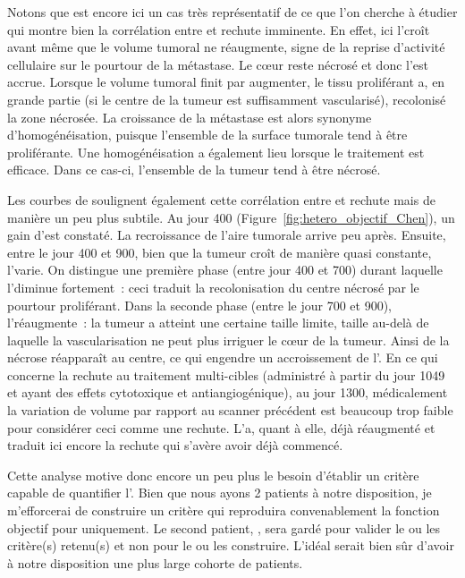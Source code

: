 \documentclass[main.tex]{subfiles}
\begin{document}
 
Notons que \Nber est encore ici un cas très représentatif de ce que l'on cherche à étudier \ie qui montre bien la corrélation entre \hetero et rechute imminente. En effet, ici l'\hetero croît avant même que le volume tumoral ne réaugmente, signe de la reprise d'activité cellulaire sur le pourtour de la métastase. Le c\oe{}ur reste nécrosé et donc l'\hetero est accrue. Lorsque le volume tumoral  finit par augmenter, le tissu proliférant a, en grande partie (si le centre de la tumeur est suffisamment vascularisé), recolonisé la zone nécrosée. La croissance de la métastase est alors synonyme d'homogénéisation, puisque l'ensemble de la surface tumorale tend à être proliférante. Une homogénéisation a également lieu lorsque le traitement est efficace. Dans ce cas-ci, l'ensemble de la tumeur tend à être nécrosé. 


Les courbes de \Chen soulignent également cette corrélation entre \hetero et rechute mais de manière un peu plus subtile. Au jour 400 (\cf Figure~\ref{fig:hetero_objectif_Chen}), un gain d'\hetero est constaté. La recroissance de l'aire tumorale arrive peu après. Ensuite, entre le jour 400 et 900, bien que la tumeur croît de manière quasi constante, l'\hetero varie. On distingue une première phase (entre jour 400 et 700) durant laquelle l'\hetero diminue fortement~: ceci traduit la recolonisation du centre nécrosé par le pourtour proliférant. Dans la seconde phase (entre le jour 700 et 900), l'\hetero réaugmente~: la tumeur a atteint une certaine taille limite, taille au-delà de laquelle la vascularisation ne peut plus irriguer le c\oe{}ur de la tumeur. 
Ainsi de la nécrose réapparaît au centre, ce qui engendre un accroissement de l'\hetero. 
En ce qui concerne la rechute au traitement multi-cibles (administré à partir du jour 1049 et ayant des effets cytotoxique et antiangiogénique), au jour 1300, médicalement la variation de volume par rapport au scanner précédent est beaucoup trop faible pour considérer ceci comme une rechute. L'\hetero a, quant à elle, déjà réaugmenté et traduit ici encore la rechute qui s'avère avoir déjà commencé.  


Cette analyse motive donc encore un peu plus le besoin d'établir un critère capable de quantifier l'\hetero. Bien que nous ayons 2 patients à notre disposition, je m'efforcerai de construire un critère qui reproduira convenablement la fonction objectif pour \Nber uniquement. Le second patient, \Chen, sera gardé pour valider le ou les critère(s) retenu(s) et non pour le ou les construire. L'idéal serait bien sûr d'avoir à notre disposition une plus large cohorte de patients.
\end{document}
